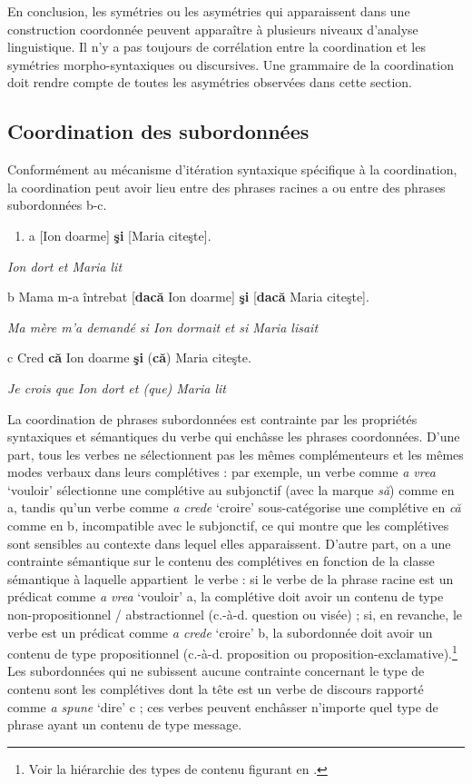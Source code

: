 En conclusion, les symétries ou les asymétries qui apparaissent dans une construction coordonnée peuvent apparaître à plusieurs niveaux d'analyse linguistique. Il n'y a pas toujours de corrélation entre la coordination et les symétries morpho-syntaxiques ou discursives. Une grammaire de la coordination doit rendre compte de toutes les asymétries observées dans cette section. 

\subsection{Coordination des subordonnées}
\label{bkm:Ref302035143}Conformément au mécanisme d'itération syntaxique spécifique à la coordination, la coordination peut avoir lieu entre des phrases racines a ou entre des phrases subordonnées b-c. 


\begin{enumerate}
\item \label{bkm:Ref273454770}a  [Ion doarme] \textbf{şi} [Maria citeşte].


\end{enumerate}
{\itshape
Ion dort et Maria lit}

  b  Mama m-a întrebat [\textbf{dacă} Ion doarme] \textbf{şi} [\textbf{dacă} Maria citeşte].

{\itshape
Ma mère m'a demandé si Ion dormait et si Maria lisait}

  c  Cred \textbf{că} Ion doarme \textbf{şi} (\textbf{că}) Maria citeşte.

    \textit{Je crois que Ion dort et (que) Maria lit}

La coordination de phrases subordonnées est contrainte par les propriétés syntaxiques et sémantiques du verbe qui enchâsse les phrases coordonnées. D'une part, tous les verbes ne sélectionnent pas les mêmes complémenteurs et les mêmes modes verbaux dans leurs complétives : par exemple, un verbe comme \textit{a vrea} `vouloir' sélectionne une complétive au subjonctif (avec la marque \textit{să}) comme en a, tandis qu'un verbe comme \textit{a crede} `croire' sous-catégorise une complétive en \textit{că} comme en b\textit{,} incompatible avec le subjonctif, ce qui montre que les complétives sont sensibles au contexte dans lequel elles apparaissent. D'autre part, on a une contrainte sémantique sur le contenu des complétives en fonction de la classe sémantique à laquelle appartient~le verbe : si le verbe de la phrase racine est un prédicat comme \textit{a vrea} `vouloir' a, la complétive doit avoir un contenu de type non-propositionnel / abstractionnel (c.-à-d. question ou visée) ; si, en revanche, le verbe est un prédicat comme \textit{a crede} `croire' b, la subordonnée doit avoir un contenu de type propositionnel (c.-à-d. proposition ou proposition-exclamative).\footnote{Voir la hiérarchie des types de contenu figurant en .}  Les subordonnées qui ne subissent aucune contrainte concernant le type de contenu sont les complétives dont la tête est un verbe de discours rapporté comme \textit{a spune} `dire' c ; ces verbes peuvent enchâsser n'importe quel type de phrase ayant un contenu de type message.


